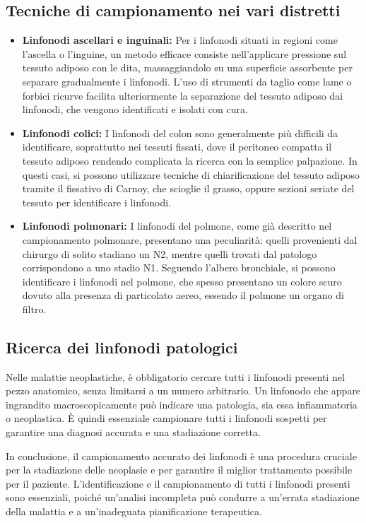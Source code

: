 \subsection{Tecniche di campionamento nei vari distretti}
\begin{itemize}
    \item \textbf{Linfonodi ascellari e inguinali:} Per i linfonodi situati in regioni come l'ascella o l'inguine, un metodo efficace consiste nell'applicare pressione sul tessuto adiposo con le dita, massaggiandolo su una superficie assorbente per separare gradualmente i linfonodi. L'uso di strumenti da taglio come lame o forbici ricurve facilita ulteriormente la separazione del tessuto adiposo dai linfonodi, che vengono identificati e isolati con cura.
    
    \item \textbf{Linfonodi colici:} I linfonodi del colon sono generalmente più difficili da identificare, soprattutto nei tessuti fissati, dove il peritoneo compatta il tessuto adiposo rendendo complicata la ricerca con la semplice palpazione. In questi casi, si possono utilizzare tecniche di chiarificazione del tessuto adiposo tramite il fissativo di Carnoy, che scioglie il grasso, oppure sezioni seriate del tessuto per identificare i linfonodi.

    \item \textbf{Linfonodi polmonari:} I linfonodi del polmone, come già descritto nel campionamento polmonare, presentano una peculiarità: quelli provenienti dal chirurgo di solito stadiano un N2, mentre quelli trovati dal patologo corrispondono a uno stadio N1. Seguendo l'albero bronchiale, si possono identificare i linfonodi nel polmone, che spesso presentano un colore scuro dovuto alla presenza di particolato aereo, essendo il polmone un organo di filtro.
\end{itemize}

\subsection{Ricerca dei linfonodi patologici}
Nelle malattie neoplastiche, è obbligatorio cercare tutti i linfonodi presenti nel pezzo anatomico, senza limitarsi a un numero arbitrario. Un linfonodo che appare ingrandito macroscopicamente può indicare una patologia, sia essa infiammatoria o neoplastica. È quindi essenziale campionare tutti i linfonodi sospetti per garantire una diagnosi accurata e una stadiazione corretta.

In conclusione, il campionamento accurato dei linfonodi è una procedura cruciale per la stadiazione delle neoplasie e per garantire il miglior trattamento possibile per il paziente. L'identificazione e il campionamento di tutti i linfonodi presenti sono essenziali, poiché un'analisi incompleta può condurre a un'errata stadiazione della malattia e a un'inadeguata pianificazione terapeutica.


